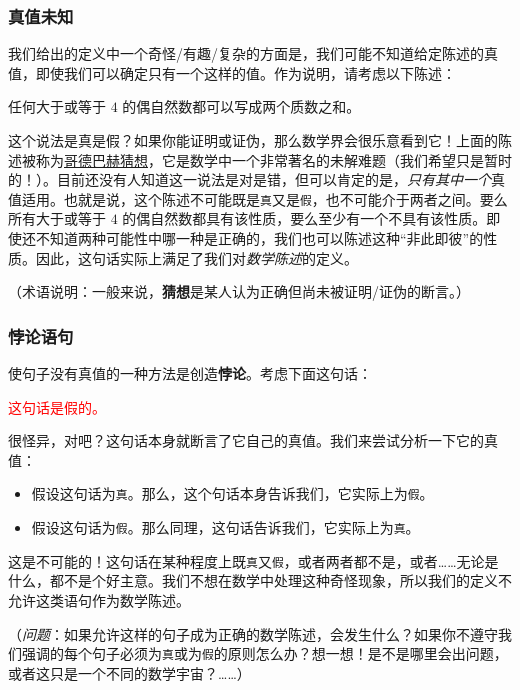 \subsubsection*{真值未知}

我们给出的定义中一个奇怪/有趣/复杂的方面是，我们可能不知道给定陈述的真值，即使我们可以确定只有一个这样的值。作为说明，请考虑以下陈述：
\begin{center}
    \textcolor{olivegreen}{任何大于或等于 $4$ 的偶自然数都可以写成两个质数之和。}
\end{center}

这个说法是真是假？如果你能证明或证伪，那么数学界会很乐意看到它！上面的陈述被称为\href{https://baike.baidu.com/item/哥德巴赫猜想/72364}{哥德巴赫猜想}，它是数学中一个非常著名的未解难题（我们希望只是暂时的！）。目前还没有人知道这一说法是对是错，但可以肯定的是，\emph{只有其中一个}真值适用。也就是说，这个陈述不可能既是\verb|真|又是\verb|假|，也不可能介于两者之间。要么所有大于或等于 $4$ 的偶自然数都具有该性质，要么至少有一个不具有该性质。即使还不知道两种可能性中哪一种是正确的，我们也可以陈述这种``非此即彼''的性质。因此，这句话实际上满足了我们对\emph{数学陈述}的定义。

（术语说明：一般来说，\textbf{猜想}是某人认为正确但尚未被证明/证伪的断言。）

\subsubsection*{悖论语句}

使句子没有真值的一种方法是创造\textbf{悖论}。考虑下面这句话：
\begin{center}
    \textcolor{red}{这句话是假的。}
\end{center}
很怪异，对吧？这句话本身就断言了它自己的真值。我们来尝试分析一下它的真值：
\begin{itemize}
    \item 假设这句话为\verb|真|。那么，这个句话本身告诉我们，它实际上为\verb|假|。
    \item 假设这句话为\verb|假|。那么同理，这句话告诉我们，它实际上为\verb|真|。
\end{itemize}
这是不可能的！这句话在某种程度上既\verb|真|又\verb|假|，或者两者都不是，或者……无论是什么，都不是个好主意。我们不想在数学中处理这种奇怪现象，所以我们的定义不允许这类语句作为数学陈述。

（\emph{问题}：如果允许这样的句子成为正确的数学陈述，会发生什么？如果你不遵守我们强调的每个句子必须为\verb|真|或为\verb|假|的原则怎么办？想一想！是不是哪里会出问题，或者这只是一个不同的数学宇宙？……）

